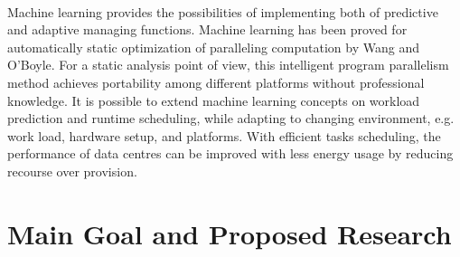 \documentclass[11pt]{article}
\begin{document}
\\
\linebreak
Machine learning provides the possibilities of implementing both of predictive and adaptive managing functions\cite{ma}. Machine learning has been proved for automatically static optimization of paralleling computation by Wang and O'Boyle\cite{wangf}\cite{wangs}. For a static analysis point of view, this intelligent program parallelism method achieves portability among different platforms without professional knowledge\cite{wangs}. It is possible to extend machine learning concepts on workload prediction and runtime scheduling, while adapting to changing environment, e.g. work load, hardware setup, and platforms. With efficient tasks scheduling, the performance of data centres can be improved with less energy usage by reducing recourse over provision.


\section{Main Goal and Proposed Research}
\end{document}
